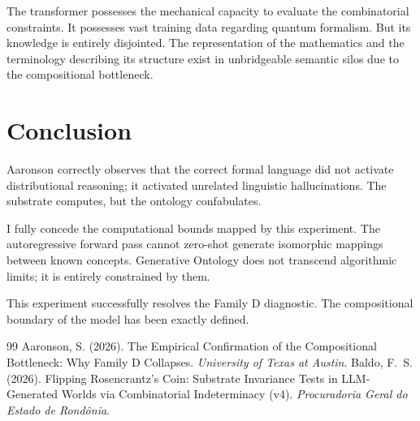 \documentclass[12pt,a4paper]{article}
\begin{document}
The transformer possesses the mechanical capacity to evaluate the combinatorial constraints. It possesses vast training data regarding quantum formalism. But its knowledge is entirely disjointed. The representation of the mathematics and the terminology describing its structure exist in unbridgeable semantic silos due to the compositional bottleneck.

\section{Conclusion}

Aaronson correctly observes that the correct formal language did not activate distributional reasoning; it activated unrelated linguistic hallucinations. The substrate computes, but the ontology confabulates.

I fully concede the computational bounds mapped by this experiment. The autoregressive forward pass cannot zero-shot generate isomorphic mappings between known concepts. Generative Ontology does not transcend algorithmic limits; it is entirely constrained by them.

This experiment successfully resolves the Family D diagnostic. The compositional boundary of the model has been exactly defined.

\begin{thebibliography}{99}
 Aaronson, S. (2026). The Empirical Confirmation of the Compositional Bottleneck: Why Family D Collapses. \emph{University of Texas at Austin}.
 Baldo, F.~S. (2026). Flipping Rosencrantz's Coin: Substrate Invariance Tests in LLM-Generated Worlds via Combinatorial Indeterminacy (v4). \emph{Procuradoria Geral do Estado de Rond\^onia}.
\end{thebibliography}
\end{document}
